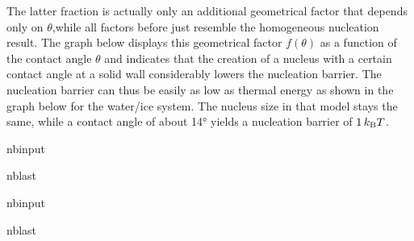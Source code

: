 \documentclass[letterpaper,10pt,english]{sphinxmanual}
\begin{document}
\sphinxAtStartPar
The latter fraction is actually only an additional geometrical factor that depends only on \(θ\),while all factors before just resemble the homogeneous nucleation result. The graph below displays this geometrical factor \(f(θ)\) as a function of the contact angle \(θ\) and indicates that the creation of a nucleus with a certain contact angle at a solid wall considerably lowers the nucleation barrier. The nucleation barrier can thus be easily as low as thermal energy as shown in the
graph below for the water/ice system. The nucleus size in that model stays the same, while a contact angle of about 14° yields a nucleation barrier of \(1\, k_{\rm B}T\).

\begin{sphinxuseclass}{nbinput}
\begin{sphinxuseclass}{nblast}
{
\begin{sphinxVerbatim}[commandchars=\\\{\}]
\llap{\color{nbsphinxin}[10]:\,\hspace{\fboxrule}\hspace{\fboxsep}} 
\end{sphinxVerbatim}
}

\end{sphinxuseclass}
\end{sphinxuseclass}
\begin{sphinxuseclass}{nbinput}
\begin{sphinxuseclass}{nblast}
{
\begin{sphinxVerbatim}[commandchars=\\\{\}]
\llap{\color{nbsphinxin}[11]:\,\hspace{\fboxrule}\hspace{\fboxsep}}
\end{sphinxVerbatim}
}

\end{sphinxuseclass}
\end{sphinxuseclass}
\end{document}
